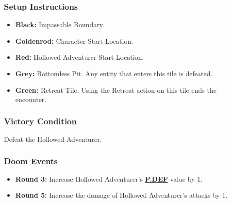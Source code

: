 \documentclass[12pt]{article}
\newcommand{\refto}[1]{\hyperlink{#1}{\textbf{#1}}}
\begin{document}
\subsubsection*{Setup Instructions}
\begin{itemize}
\item \textbf{Black:} Impassable Boundary.
\item \textbf{Goldenrod:} Character Start Location.
\item \textbf{Red:} Hollowed Adventurer Start Location.
\item \textbf{Grey:} Bottomless Pit. Any entity that enters this tile is defeated.
\item \textbf{Green:} Retreat Tile. Using the Retreat action on this tile ends the encounter.
\end{itemize}

\subsubsection*{Victory Condition}
Defeat the Hollowed Adventurer.

\subsubsection*{Doom Events}
\begin{itemize}
\item \textbf{Round 3:} Increase Hollowed Adventurer’s \refto{P.DEF} value by 1.
\item \textbf{Round 5:} Increase the damage of Hollowed Adventurer’s attacks by 1.
\end{itemize}

\pagebreak
\end{document}
